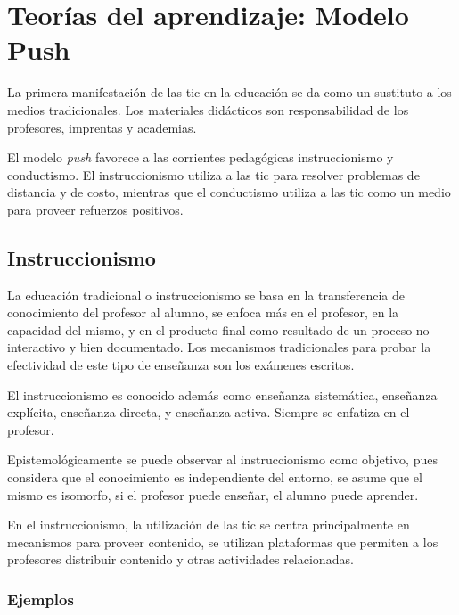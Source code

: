 \section{Teorías del aprendizaje: Modelo Push}


La primera manifestación de las \gls{tic} en la educación se da como un
sustituto a los medios tradicionales. Los materiales didácticos son
responsabilidad de los profesores, imprentas y
academias\cite{leinonen:ict,white:ict}.

El modelo \textit{push} favorece a las corrientes pedagógicas instruccionismo y
conductismo. El instruccionismo utiliza a las \gls{tic} para resolver problemas
de distancia y de costo\cite{igi:instructionism,johnson2005instructionism},
mientras que el conductismo utiliza a las \gls{tic} como un medio para proveer
refuerzos positivos\cite{weegar2012comparison}.

\subsection{Instruccionismo}

La educación tradicional o instruccionismo se basa en la transferencia de
conocimiento del profesor al alumno, se enfoca más en el profesor, en la
capacidad del mismo, y en el producto final como resultado de un proceso no
interactivo y bien
documentado\cite{igi:instructionism,johnson2005instructionism}. Los mecanismos
tradicionales para probar la efectividad de este tipo de enseñanza son los
exámenes escritos.

El instruccionismo es conocido además como enseñanza sistemática, enseñanza
explícita, enseñanza directa, y enseñanza
activa\cite{johnson2005instructionism}. Siempre se enfatiza en el
profesor\cite{johnson2005instructionism}.

Epistemológicamente se puede observar al instruccionismo como objetivo, pues
considera que el conocimiento es independiente del entorno, se asume que el
mismo es isomorfo, si el profesor puede enseñar, el alumno puede
aprender\cite{johnson2005instructionism}.

En el instruccionismo, la utilización de las \Gls{tic} se centra principalmente
en mecanismos para proveer contenido, se utilizan plataformas que
permiten a los profesores distribuir contenido y otras actividades relacionadas.

\subsubsection{Ejemplos}

